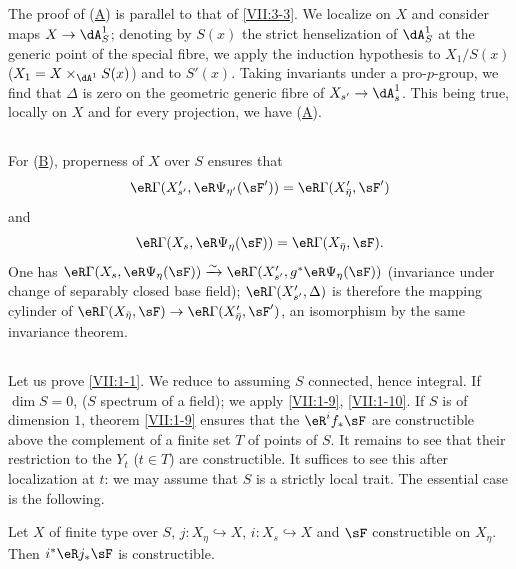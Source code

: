 \subsection{}\label{VII:3-8}

The proof of (\hyperlink{VII:3-A}{A}) is parallel to that of
\ref{VII:3-3}. We localize on $X$ and consider maps
$X\to \dA_S^1$; denoting by $S(x)$ the strict henselization of $\dA_S^1$ at the
generic point of the special fibre, we apply the induction hypothesis
to $X_1/S(x)$ ($X_1=X\times_{\dA^1} S(x)$) and to $S'(x)$. Taking
invariants under a pro-$p$-group, we find that $\Delta$ is zero on the
geometric generic fibre of $X_{s'} \to \dA_s^1$. This being true,
locally on $X$ and for every projection, we have (\hyperlink{VII:3-A}{A}).




\subsection{}\label{VII:3-9}

For (\hyperlink{VII:3-B}{B}), properness of $X$ over $S$ ensures that
\[
  \eR\Gamma(X_{s'}',\eR\Psi_{\eta'}(\sF')) = \eR\Gamma(X_{\bar\eta}',\sF')
\]
and
\[
  \eR\Gamma(X_s,\eR\Psi_\eta(\sF)) = \eR\Gamma(X_{\bar\eta},\sF) \text{.}
\]
One has
$\eR\Gamma(X_s,\eR\Psi_\eta(\sF))\iso \eR\Gamma(X_{s'}',g^\ast\eR\Psi_\eta(\sF))$
(invariance under change of separably closed base field);
$\eR\Gamma(X_{s'}', \Delta)$ is therefore the mapping cylinder of
$\eR\Gamma(X_{\bar\eta},\sF) \to \eR\Gamma(X_{\bar\eta}',\sF')$, an
isomorphism by the same invariance theorem.




\subsection{}\label{VII:3-10}

Let us prove \ref{VII:1-1}. We reduce to assuming $S$ connected, hence
integral. If $\dim S=0$, ($S$ spectrum of a field); we apply \ref{VII:1-9},
\ref{VII:1-10}. If $S$ is of dimension $1$, theorem \ref{VII:1-9}
ensures that the $\eR^i f_\ast \sF$ are constructible above the complement
of a finite set $T$ of points of $S$. It remains to see that their restriction
to the $Y_t$ ($t\in T$) are constructible. It suffices to see this after
localization at $t$: we may assume that $S$ is a strictly local trait.
The essential case is the following.




\begin{lemma_}\label{VII:3-11}
Let $X$ of finite type over $S$, $j:X_\eta\hookrightarrow X$,
$i:X_s\hookrightarrow X$ and $\sF$ constructible on $X_\eta$. Then
$i^\ast\eR j_\ast \sF$ is constructible.
\end{lemma_}

